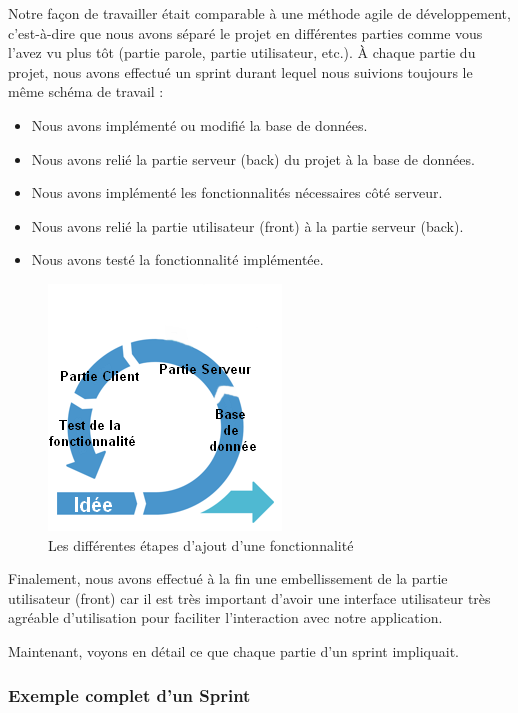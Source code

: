 \documentclass[12pt,french]{article}
\begin{document}
Notre façon de travailler était comparable à une méthode agile de développement, c'est-à-dire que nous avons séparé le projet en différentes parties comme vous l'avez vu plus tôt (partie parole, partie utilisateur, etc.). À chaque partie du projet, nous avons effectué un sprint durant lequel nous suivions toujours le même schéma de travail :

\begin{itemize}
	\item Nous avons implémenté ou modifié la base de données.
	\item Nous avons relié la partie serveur (back) du projet à la base de données.
	\item Nous avons implémenté les fonctionnalités nécessaires côté serveur.
	\item Nous avons relié la partie utilisateur (front) à la partie serveur (back).
	\item Nous avons testé la fonctionnalité implémentée.
\end{itemize}

\begin{figure}[H]
	\centering
	\includegraphics[scale=1]{agile.png}
	\caption{Les différentes étapes d'ajout d'une fonctionnalité}
\end{figure}

Finalement, nous avons effectué à la fin une embellissement de la partie utilisateur (front) car il est très important d'avoir une interface utilisateur très agréable d'utilisation pour faciliter l'interaction avec notre application.

Maintenant, voyons en détail ce que chaque partie d'un sprint impliquait.

\subsubsection{Exemple complet d'un Sprint}
\end{document}

